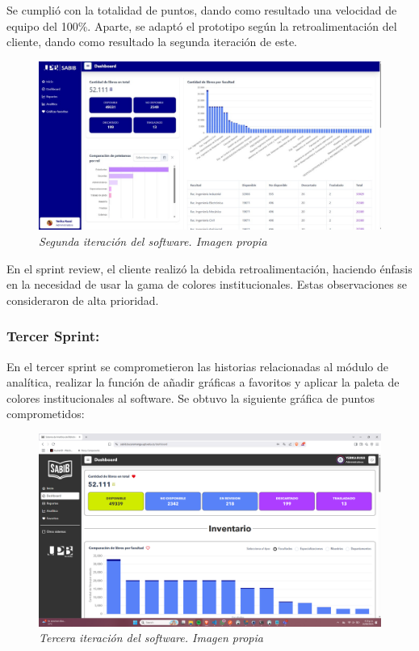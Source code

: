 \documentclass[spanish]{ieee_upb}
\begin{document}
Se cumplió con la totalidad de puntos, dando como resultado una velocidad de equipo del 100\%. Aparte, se adaptó el prototipo
según la retroalimentación del cliente, dando como resultado la segunda iteración de este.

\begin{figure}[htpb] 
	\centering
	\includegraphics[width=0.8\linewidth]{img/UX/s2-1.jpg}
	\vspace{-1mm}
	\caption[Segunda iteración del software]{\textit{Segunda iteración del software. Imagen propia}}
	\label{fig:S2-1} 
\end{figure}

En el sprint review, el cliente realizó la debida retroalimentación, haciendo énfasis en la necesidad de usar la gama
de colores institucionales. Estas observaciones se consideraron de alta prioridad.

\subsubsection[Tercer Sprint]{Tercer Sprint: }

En el tercer sprint se comprometieron las historias relacionadas al módulo de analítica, realizar la función de añadir 
gráficas a favoritos y aplicar la paleta de colores institucionales al software. Se obtuvo la siguiente gráfica de puntos comprometidos:

\begin{figure}[htpb] 
	\centering
	\includegraphics[width=0.8\linewidth]{img/UX/s3-1.png}
	\vspace{-1mm}
	\caption[Tercera iteración del software]{\textit{Tercera iteración del software. Imagen propia}}
	\label{fig:S3-1} 
\end{figure}
\end{document}
